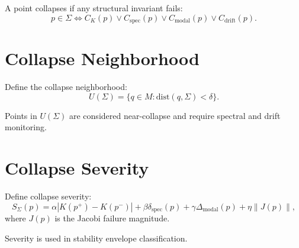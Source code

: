 \documentclass[11pt]{article}
\begin{document}
A point collapses if any structural invariant fails:
\[
p \in \Sigma
  \iff
  C_K(p)
  \lor C_{\mathrm{spec}}(p)
  \lor C_{\mathrm{modal}}(p)
  \lor C_{\mathrm{drift}}(p).
\]

\section{Collapse Neighborhood}

Define the collapse neighborhood:
\[
U(\Sigma)
  = \{ q \in M : \mathrm{dist}(q, \Sigma) < \delta \}.
\]

Points in $U(\Sigma)$ are considered near-collapse and require spectral
and drift monitoring.

\section{Collapse Severity}

Define collapse severity:
\[
S_{\Sigma}(p)
  = \alpha |K(p^+) - K(p^-)| 
  + \beta \delta_{\mathrm{spec}}(p)
  + \gamma \Delta_{\mathrm{modal}}(p)
  + \eta \|J(p)\|,
\]
where $J(p)$ is the Jacobi failure magnitude.

Severity is used in stability envelope classification.
\end{document}
